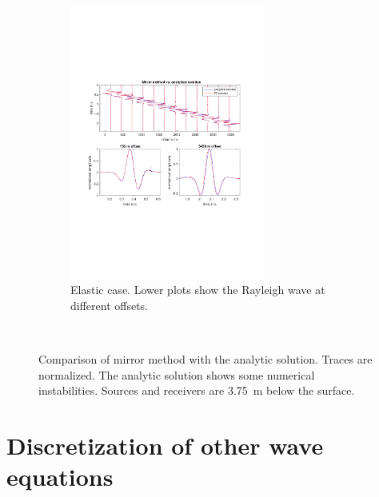 \documentclass[pdftex,a4paper,parskip,listof=totoc,bibliography=totoc,onehalfspacing,12pt]{scrreprt}
\begin{document}
\begin{figure}
\begin{subfigure}[b]{1.0\textwidth}
    \includegraphics[width=0.7\textwidth,trim=2cm 7cm 2cm 7cm, clip=true]{images/fd_vs_analytic_elastic_mirror.pdf}
    \caption{Elastic case. Lower plots show the Rayleigh wave at different offsets.}
  \end{subfigure} \\
  \caption{Comparison of mirror method with the analytic solution. Traces are normalized. The analytic solution shows some numerical instabilities. Sources and receivers are \SI{3.75}{\meter} below the surface.}\label{fig:MirrorvsAnalytic}
\end{figure}

\cleardoublepage
{}
\listoffigures 
{}
\listoftables
{}
\cleardoublepage
%



\appendix
\chapter{Discretization of other wave equations}
\label{sec:Discretization_of_other_wave_equations}
\end{document}
